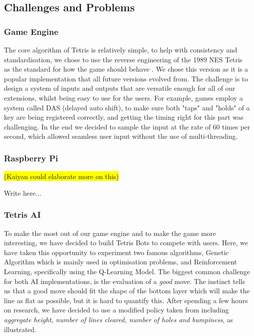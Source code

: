 \documentclass[11pt]{article}
\begin{document}
\subsection{Challenges and Problems}

\subsubsection{Game Engine}
\begin{flushleft}
The core algorithm of Tetris is relatively simple, to help with consistency and standardisation, we chose to use the reverse engineering of the 1989 NES Tetris as the standard for how the game should behave \cite{tetrisreverseengineering}. We chose this version as it is a popular implementation that all future versions evolved from. The challenge is to design a system of inputs and outputs that are versatile enough for all of our extensions, whilst being easy to use for the users. For example, games employ a system called DAS (delayed auto shift), to make sure both "taps" and "holds" of a key are being registered correctly, and getting the timing right for this part was challenging. In the end we decided to sample the input at the rate of 60 times per second, which allowed seamless user input without the use of multi-threading. 
\end{flushleft}

\subsubsection{Raspberry Pi}
\colorbox{yellow}{(Kaiyan could elaborate more on this)}
\begin{flushleft}
Write here...
\end{flushleft}

\subsubsection{Tetris AI}
To make the most out of our game engine and to make the game more interesting, we have decided to build Tetris Bots to compete with users. Here, we have taken this opportunity to experiment two famous algorithms, Genetic Algorithm which is mainly used in optimisation problems, and Reinforcement Learning, specifically using the Q-Learning Model. The biggest common challenge for both AI implementations, is the evaluation of a \textit{good} move. The instinct tells us that a good move should fit the shape of the bottom layer which will make the line as flat as possible, but it is hard to quantify this. After spending a few hours on research, we have decided to use a modified policy taken from \cite{tetrisai} including \textit{aggregate height, number of lines cleared, number of holes and bumpiness}, as illustrated.  
\end{document}
